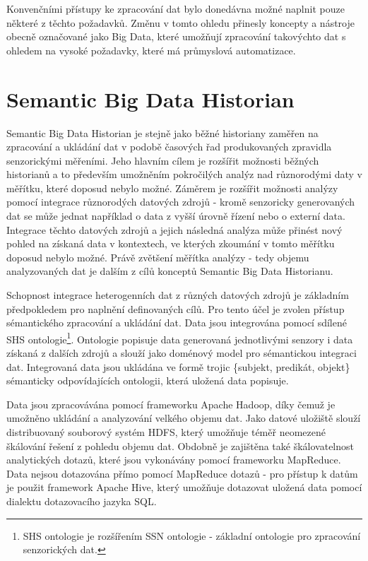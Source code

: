 \documentclass[11pt,twoside,a4paper]{book}
\begin{document}
		Konvenčními přístupy ke zpracování dat bylo donedávna možné naplnit pouze některé z těchto požadavků. Změnu v tomto ohledu přinesly koncepty a nástroje obecně označované jako Big Data, které umožňují zpracování takovýchto dat s ohledem na vysoké požadavky, které má průmyslová automatizace. 
		
	\section{Semantic Big Data Historian}	
		Semantic Big Data Historian\cite{historian01, historianb02} je stejně jako běžné historiany zaměřen na zpracování a ukládání dat v podobě časových řad produkovaných zpravidla senzorickými měřeními. Jeho hlavním cílem je rozšířit možnosti běžných historianů a to především umožněním pokročilých analýz nad různorodými daty v měřítku, které doposud nebylo možné. Záměrem je rozšířit možnosti analýzy pomocí integrace různorodých datových zdrojů - kromě senzoricky generovaných dat se může jednat například o data z vyšší úrovně řízení nebo o externí data. Integrace těchto datových zdrojů a jejich následná analýza může přinést nový pohled na získaná data v kontextech, ve kterých zkoumání v tomto měřítku doposud nebylo možné. Právě zvětšení měřítka analýzy - tedy objemu analyzovaných dat je dalším z cílů konceptů Semantic Big Data Historianu.    

		Schopnost integrace heterogenních dat z různých datových zdrojů je základním předpokledem pro naplnění definovaných cílů. Pro tento účel je zvolen přístup sémantického zpracování a ukládání dat. Data jsou integrována pomocí sdílené SHS ontologie\footnote{SHS ontologie je rozšířením SSN ontologie\cite{ssn01} - základní ontologie pro zpracování senzorických dat.}. Ontologie popisuje data generovaná jednotlivými senzory i data získaná z dalších zdrojů a slouží jako doménový model pro sémantickou integraci dat. Integrovaná data jsou ukládána ve formě trojic \{subjekt, predikát, objekt\} sémanticky odpovídajících ontologii, která uložená data popisuje. 

		Data jsou zpracovávána pomocí frameworku Apache Hadoop, díky čemuž je umožněno ukládání a analyzování velkého objemu dat. Jako datové uložiště slouží distribuovaný souborový systém HDFS, který umožňuje téměř neomezené škálování řešení z pohledu objemu dat. Obdobně je zajištěna také škálovatelnost analytických dotazů, které jsou vykonávány pomocí frameworku MapReduce. Data nejsou dotazována přímo pomocí MapReduce dotazů - pro přístup k datům je použit framework Apache Hive, který umožňuje dotazovat uložená data pomocí dialektu dotazovacího jazyka SQL. 
\end{document}
